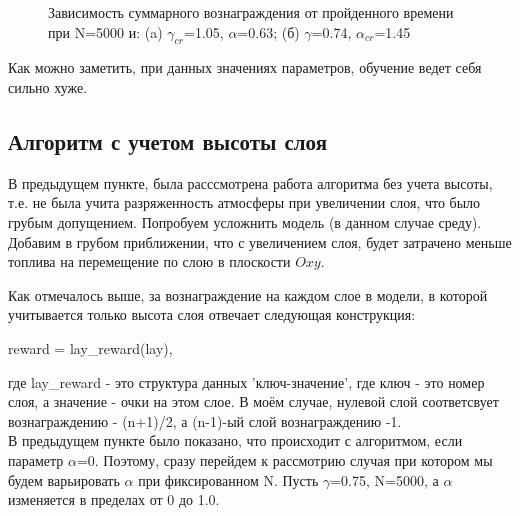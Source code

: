 \documentclass[a4paper]{report}
\theoremstyle{definition}
\theoremstyle{plain}
\theoremstyle{remark}
\theoremstyle{remark}
\theoremstyle{definition}
\begin{document}
\begin{figure}[H]
\begin{minipage}[H]{0.49\linewidth}
    \end{minipage}
     \caption{Зависимость суммарного вознаграждения от пройденного времени при N=5000 и: (a) $\gamma_{cr}$=1.05, $\alpha$=0.63; (б) $\gamma$=0.74, $\alpha_{cr}$=1.45}
\end{figure}
Как можно заметить, при данных значениях параметров, обучение ведет себя сильно хуже.
\\
\begin{center}
    \subsection{Алгоритм с учетом высоты слоя}
\end{center}

В предыдущем пункте, была расссмотрена работа алгоритма без учета высоты, т.е. не была учита разряженность атмосферы при увеличении слоя, что было грубым допущением. Попробуем усложнить модель (в данном случае среду). Добавим в грубом приближении, что с увеличением слоя, будет затрачено меньше топлива на перемещение по слою в плоскости $Oxy$. 

Как отмечалось выше, за вознаграждение на каждом слое в модели, в которой учитывается только высота слоя отвечает следующая конструкция:
\begin{center}
    reward = lay\_reward(lay),
\end{center}
где lay\_reward - это структура данных 'ключ-значение', где ключ - это номер слоя, а значение - очки на этом слое. В моём случае, нулевой слой соответсвует вознаграждению - (n+1)/2, а (n-1)-ый слой вознаграждению -1.
\\
В предыдущем пункте было показано, что происходит с алгоритмом, если параметр $\alpha$=0. Поэтому, сразу перейдем к рассмотрию случая при котором мы будем варьировать $\alpha$ при фиксированном N. Пусть $\gamma$=0.75, N=5000, а $\alpha$ изменяется в пределах от 0 до 1.0.
\end{document}

